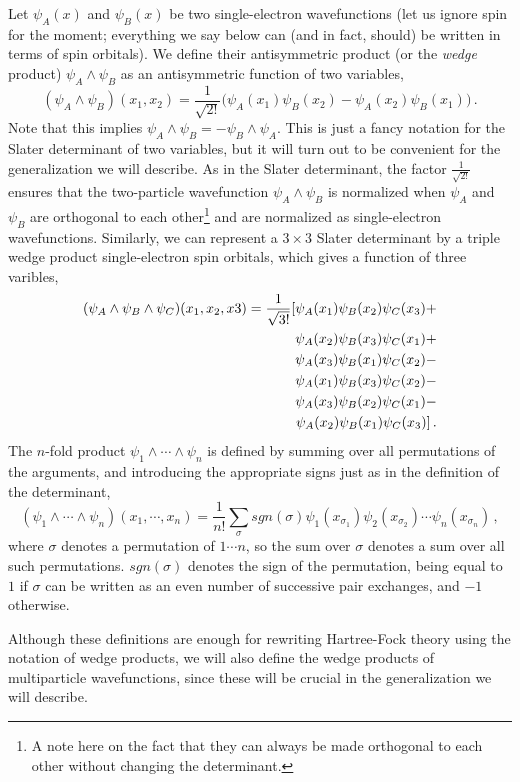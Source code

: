 \documentclass[11pt]{article}
\begin{document}
Let $\psi_A(x)$ and $\psi_B(x)$ be two single-electron wavefunctions
(let us ignore spin for the moment; everything we say below can (and
in fact, should) be written in terms of spin orbitals). We define
their antisymmetric product (or the {\it wedge} product) $\psi_A
\wedge \psi_B$ as an antisymmetric function of two variables,
\begin{equation}
  (\psi_A \wedge \psi_B)(x_1, x_2) = \frac{1}{\sqrt{2!}} \big(\psi_A(x_1)
  \psi_B(x_2) - \psi_A(x_2)\psi_B(x_1)\big)\,.
\end{equation}
Note that this implies $\psi_A\wedge \psi_B=-\psi_B\wedge\psi_A$. 
This is just a fancy notation for the Slater determinant of two
variables, but it will turn out to be convenient for the
generalization we will describe. As in the Slater determinant, the
factor $\frac{1}{\sqrt{2!}}$ ensures that the two-particle wavefunction
$\psi_A\wedge \psi_B$ is normalized when $\psi_A$ and $\psi_B$ are
orthogonal to each other\footnote{A note here on the fact that they
  can always be made orthogonal to each other without changing the
  determinant.} 
and are normalized as single-electron 
wavefunctions. Similarly, we can represent a
$3\times 3$ Slater determinant by a triple wedge product
single-electron spin orbitals, which gives a function of three varibles,
\begin{eqnarray}
  (\psi_A \wedge \psi_B \wedge \psi_C)(x_1,x_2,x3) =
  \frac{1}{\sqrt{3!}}\Large[
  \psi_A(x_1) \psi_B(x_2) \psi_C(x_3) + \cr
  \psi_A(x_2) \psi_B(x_3) \psi_C(x_1) + \cr
  \psi_A(x_3) \psi_B(x_1) \psi_C(x_2) - \cr
  \psi_A(x_1) \psi_B(x_3) \psi_C(x_2) - \cr
  \psi_A(x_3) \psi_B(x_2) \psi_C(x_1) - \cr
  \psi_A(x_2) \psi_B(x_1) \psi_C(x_3)\Large] \,.
\end{eqnarray}
The $n$-fold product $\psi_1\wedge\cdots\wedge\psi_n$ is defined
by summing over all permutations of the arguments, and introducing the
appropriate signs just as in the definition of the determinant,
\begin{equation}
  (\psi_1\wedge\cdots\wedge\psi_n)(x_1,\cdots,x_n) = \frac{1}{n!} \sum_{\sigma} 
  sgn(\sigma)\psi_1(x_{\sigma_1}) \psi_2(x_{\sigma_2})\cdots \psi_n(x_{\sigma_n})\,,
\end{equation}
where $\sigma$ denotes a permutation of $1\cdots n$, so the sum over
$\sigma$ denotes a sum over all such permutations. $sgn(\sigma)$
denotes the sign of the permutation, being equal to $1$ if $\sigma$
can be written as an even number of successive pair exchanges, and
$-1$ otherwise.

Although these definitions are enough for rewriting Hartree-Fock
theory using the notation of wedge products, we will also
define the wedge products of multiparticle wavefunctions, since these
will be crucial in the generalization we will describe.
\end{document}

